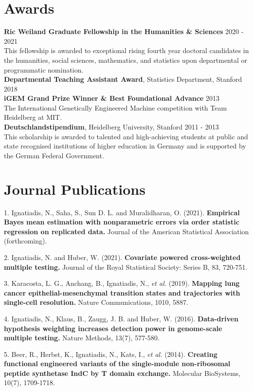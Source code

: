 \documentclass[margin,line]{res}
\newenvironment{list1}{
  \begin{list}{\ding{113}}{%
      \setlength{\itemsep}{0in}
      \setlength{\parsep}{0in} \setlength{\parskip}{0in}
      \setlength{\topsep}{0in} \setlength{\partopsep}{0in}
      \setlength{\leftmargin}{0.17in}}}{\end{list}}
\begin{document}
\begin{resume}
\section{\sc Awards}
\textbf{Ric Weiland Graduate Fellowship  in the Humanities \& Sciences } \hfill 2020 - 2021\\
This fellowship is awarded to exceptional rising fourth year doctoral candidates in the humanities, social sciences, mathematics, and
statistics upon departmental or programmatic nomination.\\
\textbf{Departmental Teaching Assistant Award}, Statistics Department, Stanford  \hfill  2018\\
\textbf{iGEM Grand Prize Winner \& Best Foundational Advance} \hfill  2013 \\
The International Genetically Engineered Machine competition with Team Heidelberg at MIT.\\
\textbf{Deutschlandstipendium}, Heidelberg University, Stanford \hfill 2011 - 2013\\
This scholarship is awarded to talented and high-achieving students at public and state recognised institutions of higher education in Germany and is supported by the German Federal Government.






\section{\sc Journal Publications}
\begin{list1}
\item[1.] Ignatiadis, N., Saha, S., Sun D. L. and Muralidharan, O. (2021). \textbf{Empirical Bayes mean estimation with nonparametric errors via order statistic regression on replicated data.} Journal of the American Statistical Association (forthcoming).
\item[2.] Ignatiadis, N. and Huber, W. (2021). \textbf{Covariate powered cross-weighted multiple testing.} Journal of the Royal Statistical Society: Series B, 83, 720-751.
\item[3.] Karacosta, L. G., Anchang, B., Ignatiadis, N., \emph{et al.} (2019). \textbf{Mapping lung cancer epithelial-mesenchymal transition states and trajectories with single-cell resolution.} Nature Communications, 1010, 5887.
\item[4.]  Ignatiadis, N., Klaus, B., Zaugg, J. B. and Huber, W. (2016). \textbf{Data-driven hypothesis weighting increases detection power in genome-scale multiple testing.} Nature Methods, 13(7), 577-580.
\item[5.] Beer, R., Herbst, K., Ignatiadis, N., Kats, I., \emph{et al.} (2014). \textbf{Creating functional engineered variants of the single-module non-ribosomal peptide synthetase IndC by T domain exchange.} Molecular BioSystems, 10(7), 1709-1718.
\end{list1}

\end{resume}
\end{document}
